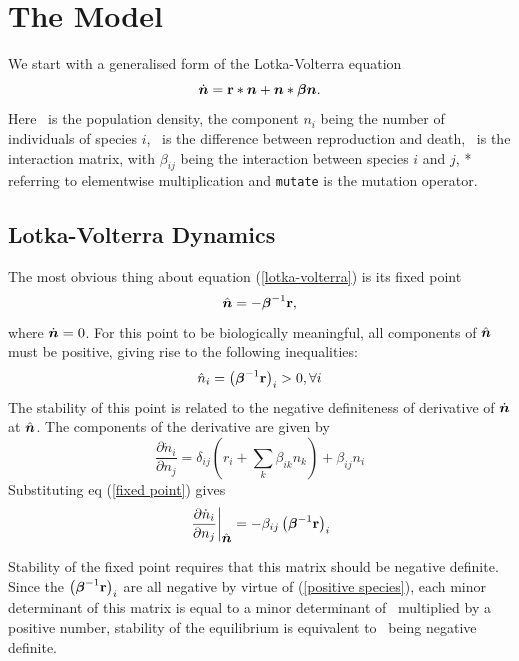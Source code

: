 \section{The Model}\label{model}

We start with a generalised form of the Lotka-Volterra equation 
\begin{equation}\label{lotka-volterra}
\dot{\mbox{\boldmath{$n$}}} = \mbox{${\bf r}$}*\mbox{\boldmath{$n$}} + \mbox{\boldmath{$n$}}*\mbox{\boldmath{$\beta$}}\mbox{\boldmath{$n$}}.
\end{equation}
Here \bn\ is the population density, the component $n_i$ being the
number of individuals of species $i$, \br\ is the difference
between reproduction and death, \bbeta\ is the interaction matrix,
with $\beta_{ij}$ being the interaction between species $i$ and $j$, *
referring to elementwise multiplication and {\tt mutate} is the
mutation operator.

\subsection{Lotka-Volterra Dynamics}

The most obvious thing about equation (\ref{lotka-volterra}) is its
fixed point 
\begin{equation}\label{fixed point}
\hat{\mbox{\boldmath{$n$}}} = -\mbox{\boldmath{$\beta$}}^{-1}\mbox{${\bf r}$},
\end{equation}
where $\dot{\mbox{\boldmath{$n$}}}=0$. For this point to be biologically meaningful, all
components of $\hat{\mbox{\boldmath{$n$}}}$ must be positive, giving rise to the following
inequalities:
\begin{equation}\label{positive species}
\hat n_i = \left(\mbox{\boldmath{$\beta$}}^{-1}\mbox{${\bf r}$}\right)_i>0, \forall i
\end{equation}
The stability of this point is related to the
negative definiteness of derivative of $\dot{\mbox{\boldmath{$n$}}}$ at $\hat{\mbox{\boldmath{$n$}}}$. The
components of the derivative are given by
\begin{equation}\label{derivative}
\frac{\partial\dot{n}_i}{\partial n_j} =
\delta_{ij}\left(r_i+\sum_k\beta_{ik}n_k\right) + \beta_{ij}n_i
\end{equation}
Substituting eq (\ref{fixed point}) gives
\begin{equation}
\left.\frac{\partial\dot{n}_i}{\partial n_j}\right|_{\hat{\mbox{\boldmath{$n$}}}}=
-\beta_{ij}\left(\mbox{\boldmath{$\beta$}}^{-1}\mbox{${\bf r}$}\right)_i
\end{equation}

Stability of the fixed point requires that this matrix should be
negative definite. Since the $\left(\mbox{\boldmath{$\beta$}}^{-1}\mbox{${\bf r}$}\right)_i$ are
all negative by virtue of (\ref{positive species}), each minor
determinant of this matrix is equal to a minor determinant of \bbeta\
multiplied by a positive number, stability of the equilibrium is
equivalent to \bbeta\ being negative definite.

